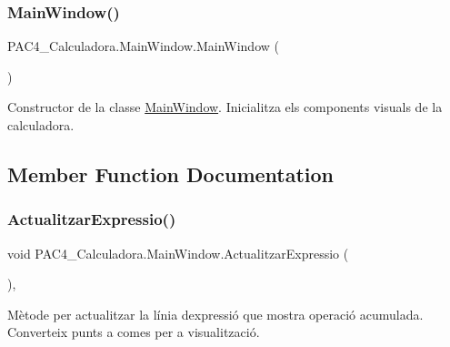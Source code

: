 \subsubsection{\texorpdfstring{Main\+Window()}{MainWindow()}}
{\footnotesize\ttfamily P\+A\+C4\+\_\+\+Calculadora.\+Main\+Window.\+Main\+Window (\begin{DoxyParamCaption}{ }\end{DoxyParamCaption})\hspace{0.3cm}{\ttfamily [inline]}}



Constructor de la classe \mbox{\hyperlink{class_p_a_c4___calculadora_1_1_main_window}{Main\+Window}}. Inicialitza els components visuals de la calculadora. 



\subsection{Member Function Documentation}
\mbox{\label{class_p_a_c4___calculadora_1_1_main_window_af1208aab8665c6acd9c81811d182a82a}} 
\subsubsection{\texorpdfstring{Actualitzar\+Expressio()}{ActualitzarExpressio()}}
{\footnotesize\ttfamily void P\+A\+C4\+\_\+\+Calculadora.\+Main\+Window.\+Actualitzar\+Expressio (\begin{DoxyParamCaption}{ }\end{DoxyParamCaption})\hspace{0.3cm}{\ttfamily [inline]}, {\ttfamily [private]}}



Mètode per actualitzar la línia d\textquotesingle{}expressió que mostra operació acumulada. Converteix punts a comes per a visualització. 

\mbox{\label{class_p_a_c4___calculadora_1_1_main_window_ac2001931ffe0b6ca6f5128310196cac0}} 
